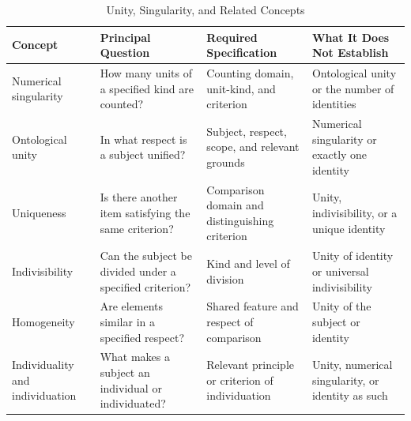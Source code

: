 %
%
%
%

\begin{table}[htbp]
\centering
\caption{Unity, Singularity, and Related Concepts}
\label{tab:unity-singularity-and-related-concepts}
\footnotesize
\renewcommand{\arraystretch}{1.2}
\begin{tabularx}{\textwidth}{
    @{}
    p{}
    X
    p{}
    p{}
    @{}
}
\toprule
\textbf{Concept} &
\textbf{Principal Question} &
\textbf{Required Specification} &
\textbf{What It Does Not Establish}
\\
\midrule

Numerical singularity &
How many units of a specified kind are counted? &
Counting domain, unit-kind, and criterion &
Ontological unity or the number of identities
\\

Ontological unity &
In what respect is a subject unified? &
Subject, respect, scope, and relevant grounds &
Numerical singularity or exactly one identity
\\

Uniqueness &
Is there another item satisfying the same criterion? &
Comparison domain and distinguishing criterion &
Unity, indivisibility, or a unique identity
\\

Indivisibility &
Can the subject be divided under a specified criterion? &
Kind and level of division &
Unity of identity or universal indivisibility
\\

Homogeneity &
Are elements similar in a specified respect? &
Shared feature and respect of comparison &
Unity of the subject or identity
\\

Individuality and individuation &
What makes a subject an individual or individuated? &
Relevant principle or criterion of individuation &
Unity, numerical singularity, or identity as such
\\


\end{tabularx}
\end{table}

